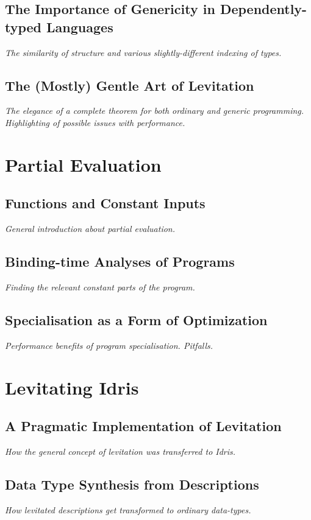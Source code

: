 \documentclass{ituthesis}
\begin{document}
\section{The Importance of Genericity in Dependently-typed Languages}
\label{sec:TheImportanceofGenericityinDependently-typedLanguages}
\textit{The similarity of structure and various slightly-different indexing of types.}
\section{The (Mostly) Gentle Art of Levitation}
\label{sec:TheMostlyGentleArtofLevitation}
\textit{The elegance of a complete theorem for both ordinary and generic programming. Highlighting of possible issues with performance.}
\chapter{Partial Evaluation}
\label{cha:PartialEvaluation}
\section{Functions and Constant Inputs}
\label{sec:FunctionsandConstantInputs}
\textit{General introduction about partial evaluation.}
\section{Binding-time Analyses of Programs}
\label{sec:Binding-timeAnalysisofPrograms}
\textit{Finding the relevant constant parts of the program.}
\section{Specialisation as a Form of Optimization}
\label{sec:SpecialisationasaFormofOptimization}
\textit{Performance benefits of program specialisation. Pitfalls.}
\chapter{Levitating Idris}
\label{cha:LevitatingIdris}
\section{A Pragmatic Implementation of Levitation}
\label{sec:APragmaticImplementationofLevitation}
\textit{How the general concept of levitation was transferred to Idris.}
\section{Data Type Synthesis from Descriptions}
\label{sec:DataTypeSynthesisfromGenericDescriptions}
\textit{How levitated descriptions get transformed to ordinary data-types.}
\end{document}
